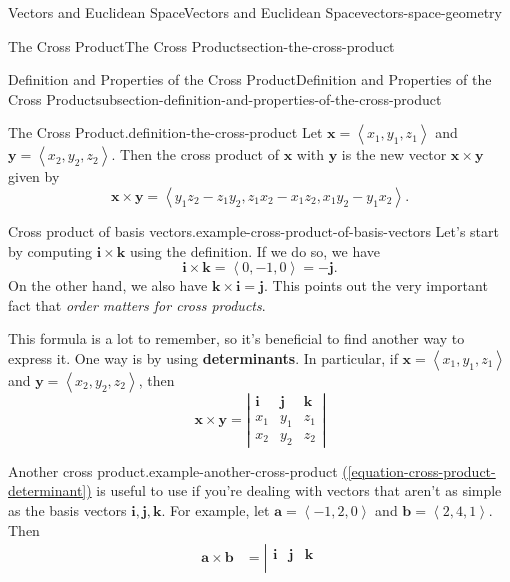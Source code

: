 \documentclass[oneside,10pt,]{book}
\newcommand{\terminology}[1]{\textbf{#1}}
\numberwithin{equation}{section}
\newcommand{\vv}[1]{\mathbf{#1}}
\newcommand{\dotprod}[1]{\left\langle #1 \right\rangle}
\begin{document}
\begin{chapterptx}{Vectors and Euclidean Space}{}{Vectors and Euclidean Space}{}{}{vectors-space-geometry}
\begin{sectionptx}{The Cross Product}{}{The Cross Product}{}{}{section-the-cross-product}
\begin{subsectionptx}{Definition and Properties of the Cross Product}{}{Definition and Properties of the Cross Product}{}{}{subsection-definition-and-properties-of-the-cross-product}
\begin{definition}{The Cross Product.}{definition-the-cross-product}%
\hypertarget{p-1166}{}%
Let \(\vv{x} = \dotprod{x_{1},y_{1},z_{1}}\) and \(\vv{y} = \dotprod{x_{2},y_{2},z_{2}}\). Then the cross product of \(\vv{x}\) with \(\vv{y}\) is the new vector \(\vv{x}\times\vv{y}\) given by%
%
\begin{equation*}
\vv{x}\times\vv{y} = \dotprod{y_{1}z_{2}-z_{1}y_{2}, z_{1}x_{2}-x_{1}z_{2}, x_{1}y_{2} - y_{1}x_{2}}.
\end{equation*}
\end{definition}
\begin{example}{Cross product of basis vectors.}{example-cross-product-of-basis-vectors}%
\hypertarget{p-1167}{}%
Let's start by computing \(\vv{i}\times\vv{k}\) using the definition. If we do so, we have%
%
\begin{equation*}
\vv{i}\times\vv{k} = \dotprod{0,-1,0} = -\vv{j}.
\end{equation*}
\hypertarget{p-1168}{}%
On the other hand, we also have \(\vv{k}\times\vv{i} = \vv{j}\). This points out the very important fact that \emph{order matters for cross products}.%
\end{example}
\hypertarget{p-1169}{}%
This formula is a lot to remember, so it's beneficial to find another way to express it. One way is by using \terminology{determinants}. In particular, if \(\vv{x} = \dotprod{x_{1},y_{1},z_{1}}\) and \(\vv{y} = \dotprod{x_{2},y_{2},z_{2}}\), then%
%
\begin{equation}
\vv{x}\times\vv{y} = \left|\begin{array}{ccc}
\vv{i} & \vv{j} & \vv{k} \\ x_{1} & y_{1} & z_{1} \\ x_{2} & y_{2} & z_{2} \end{array}\right|\label{equation-cross-product-determinant}
\end{equation}
\begin{example}{Another cross product.}{example-another-cross-product}%
\hypertarget{p-1170}{}%
\hyperref[equation-cross-product-determinant]{(\ref{equation-cross-product-determinant})} is useful to use if you're dealing with vectors that aren't as simple as the basis vectors \(\vv{i},\vv{j},\vv{k}\). For example, let \(\vv{a} = \dotprod{-1,2,0}\) and \(\vv{b} = \dotprod{2,4,1}\). Then%
%
\begin{align*}
\vv{a}\times\vv{b} & = \left|\begin{array}{ccc}
\vv{i} & \vv{j} & \vv{k} \\

\end{array}
\end{align*}
\end{example}
\end{subsectionptx}
\end{sectionptx}
\end{chapterptx}
\end{document}
